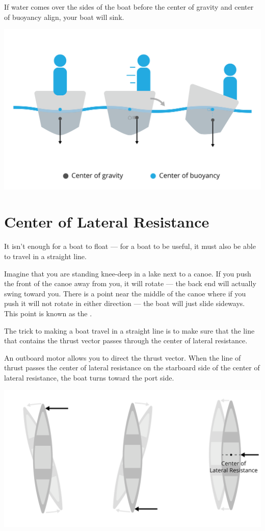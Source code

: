 If water comes over the sides of the boat before the center of gravity and center of buoyancy align, your boat will sink.

\includegraphics[width=.75\textwidth]{cgcm.png}


\section{Center of Lateral Resistance}

It isn't enough for a boat to float --- for a boat to be useful,  it must also be able to travel in a straight line.

Imagine that you are standing knee-deep in a lake next to a canoe.  If you push the front of the canoe away from you,  it will rotate --- the back end will actually
swing toward you. There is a point near the middle of the canoe where if you push it will not rotate in either direction --- the boat will just slide sideways.  This point is known as the .

The trick to making a boat travel in a straight line is to make sure that the line that contains the thrust vector passes through the center of lateral resistance.

An outboard motor allows you to direct the thrust vector. When the line of thrust passes the center of lateral resistance on the starboard side of the center of lateral resistance, the boat turns toward the port side.

\includegraphics[width=.75\textwidth]{lateralResistance.png}


